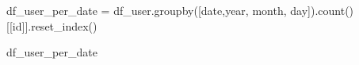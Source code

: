 \documentclass[
  letterpaper,
  DIV=11,
  numbers=noendperiod]{scrartcl}
\newenvironment{Shaded}{\begin{snugshade}}{\end{snugshade}}
\newcommand{\NormalTok}[1]{\textcolor[rgb]{0.00,0.23,0.31}{#1}}
\newcommand{\OperatorTok}[1]{\textcolor[rgb]{0.37,0.37,0.37}{#1}}
\newcommand{\StringTok}[1]{\textcolor[rgb]{0.13,0.47,0.30}{#1}}
\begin{document}
\begin{Shaded}
\begin{Highlighting}[]
\NormalTok{df\_user\_per\_date         }\OperatorTok{=}\NormalTok{ df\_user.groupby([}\StringTok{\textquotesingle{}date\textquotesingle{}}\NormalTok{,}\StringTok{\textquotesingle{}year\textquotesingle{}}\NormalTok{, }\StringTok{\textquotesingle{}month\textquotesingle{}}\NormalTok{, }\StringTok{\textquotesingle{}day\textquotesingle{}}\NormalTok{]).count()[[}\StringTok{\textquotesingle{}id\textquotesingle{}}\NormalTok{]].reset\_index()}
\end{Highlighting}
\end{Shaded}

\begin{Shaded}
\begin{Highlighting}[]
\NormalTok{df\_user\_per\_date}
\end{Highlighting}
\end{Shaded}
\end{document}

